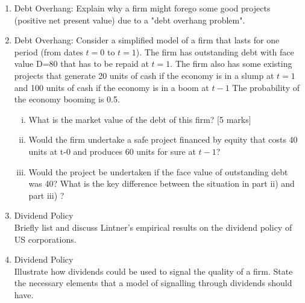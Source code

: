 \documentclass[a4paper,12pt]{article}
\begin{document}
\begin{enumerate}
\item Debt Overhang: Explain why a firm might forego some good projects (positive net present value) due to a "debt overhang problem". 
\item Debt Overhang: Consider a simplified model of a firm that lasts for one period (from dates $t=0$ to $t=1$). The firm has outstanding debt with face value D=80 that has to be repaid at $t=1$. The firm also has some existing projects that generate 20 units of cash if the economy is in a slump at $t=1$ and 100 units of cash if the economy is in a boom at $t-1$ The probability of the economy booming is 0.5. 
\begin{enumerate}[(i)]
    \item What is the market value of the debt of this firm? [5 marks]
    \item Would the firm undertake a safe project financed by equity that costs 40 units at t-0 and produces 60 units for sure at $t-1$?  
    \item Would the project be undertaken if the face value of outstanding debt was 40? What is the key difference between the situation in part ii) and part iii) ?  
\end{enumerate}
\item Dividend Policy \\ 
Briefly list and discuss Lintner's empirical results on the dividend policy of US corporations. 
\item Dividend Policy \\ Illustrate how dividends could be used to signal the quality of a firm. State the necessary elements that a model of signalling through dividends should have. 

\end{enumerate}
\end{document}

